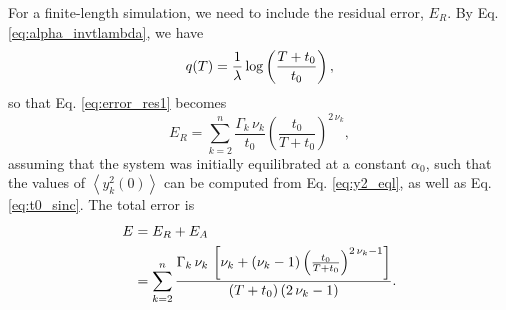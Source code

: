 \documentclass[reprint, floatfix]{revtex4-1}
\newcommand{\note}[1]{{\color{DarkGreen}\footnotesize \textsc{Note.} #1}}
\newcommand{\Err}{E}
\begin{document}
For a finite-length simulation,
we need to include the residual error, $\Err_R$.
%
By Eq. \eqref{eq:alpha_invtlambda}, we have
%
\begin{equation}
  q(T)
  =
  \frac{ 1 } { \lambda }
  \log\left(
    \frac{ T + t_0 } { t_0 }
  \right)
  ,
\notag
\end{equation}
%
so that Eq. \eqref{eq:error_res1} becomes
%
\begin{equation}
\Err_R
=
\sum_{k = 2}^n
  \frac{ \Gamma_k \, \nu_k }
       {        t_0   }
  \left(
      \frac{   t_0   }
           { T + t_0 }
   \right)^{ 2 \, \nu_k },
\label{eq:error_res_invt}
\end{equation}
%
assuming that
the system was initially equilibrated
at a constant $\alpha_0$,
such that the values of
$\left\langle y_k^2(0) \right\rangle$
can be computed from Eq. \eqref{eq:y2_eql},
as well as Eq. \eqref{eq:t0_sinc}.
%
The total error is
%
\begin{align}
\Err
&=
\Err_R + \Err_A
\notag
\\
&=
\sum_{ k = 2 }^n
  \frac
  {
    \Gamma_k \, \nu_k \,
    \left[
      \nu_k
      +
      (\nu_k - 1)
      \left(
        \frac{ t_0 } { T + t_0 }
      \right)^{ 2 \, \nu_k - 1 }
    \right]
  }
  {
    (T + t_0) \, (2 \, \nu_k - 1)
  }
  .
\label{eq:error_invt}
\end{align}
%

\end{document}
